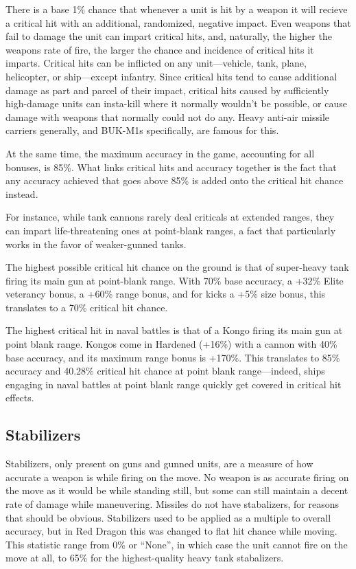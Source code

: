 \documentclass{article}
\begin{document}
There is a base 1\% chance that whenever a unit is hit by a weapon it will
recieve a critical hit with an additional, randomized, negative impact. Even
weapons that fail to damage the unit can impart critical hits, and, naturally,
the higher the weapons rate of fire, the larger the chance and incidence of
critical hits it imparts. Critical hits can be inflicted on any unit---vehicle,
tank, plane, helicopter, or ship---except infantry. Since critical hits tend to
cause additional damage as part and parcel of their impact, critical hits caused
by sufficiently high-damage units can insta-kill where it normally wouldn't be
possible, or cause damage with weapons that normally could not do any. Heavy
anti-air missile carriers generally, and BUK-M1s specifically, are famous for
this.

At the same time, the maximum accuracy in the game, accounting for all bonuses,
is 85\%. What links critical hits and accuracy together is the fact that any
accuracy achieved that goes above 85\% is added onto the critical hit chance
instead.

For instance, while tank cannons rarely deal criticals at extended ranges, they
can impart life-threatening ones at point-blank ranges, a fact that
particularly works in the favor of weaker-gunned tanks.

The highest possible critical hit chance on the ground is that of super-heavy
tank firing its main gun at point-blank range. With 70\% base accuracy, a
+32\% Elite veterancy bonus, a +60\% range bonus, and for kicks a +5\% size
bonus, this translates to a 70\% critical hit chance.

The highest critical hit in naval battles is that of a Kongo
firing its main gun at point blank range. Kongos come in Hardened (+16\%) with
a cannon with 40\% base accuracy, and its maximum range bonus is +170\%. This
translates to 85\% accuracy and 40.28\% critical hit chance at point blank
range---indeed, ships engaging in naval battles at point blank range quickly
get covered in critical hit effects.

\subsection{Stabilizers}

Stabilizers, only present on guns and gunned units, are a measure of how
accurate a weapon is while firing on the move. No weapon is as accurate firing
on the move as it would be while standing still, but some can still maintain a
decent rate of damage while maneuvering. Missiles do not have stabalizers, for
reasons that should be obvious. Stabilizers used to be applied as a multiple to
overall accuracy, but in Red Dragon this was changed to flat hit chance while
moving. This statistic range from 0\% or ``None'', in which case the unit cannot
fire on the move at all, to 65\% for the highest-quality heavy tank stabalizers.
\end{document}
